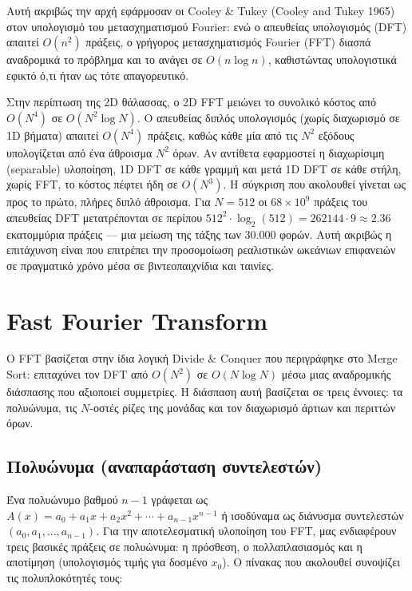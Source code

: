 Αυτή ακριβώς την αρχή εφάρμοσαν οι Cooley \& Tukey (Cooley and Tukey
1965) στον υπολογισμό του μετασχηματισμού Fourier: ενώ ο απευθείας
υπολογισμός (DFT) απαιτεί \(O(n^2)\) πράξεις, ο γρήγορος μετασχηματισμός
Fourier (FFT) διασπά αναδρομικά το πρόβλημα και το ανάγει σε
\(O(n \log n)\), καθιστώντας υπολογιστικά εφικτό ό,τι ήταν ως τότε
απαγορευτικό.

Στην περίπτωση της 2D θάλασσας, ο 2D FFT μειώνει το συνολικό κόστος από
\(O(N^4)\) σε \(O(N^2 \log N)\). Ο απευθείας διπλός υπολογισμός (χωρίς
διαχωρισμό σε 1D βήματα) απαιτεί \(O(N^4)\) πράξεις, καθώς κάθε μία από
τις \(N^2\) εξόδους υπολογίζεται από ένα άθροισμα \(N^2\) όρων. Αν
αντίθετα εφαρμοστεί η διαχωρίσιμη (separable) υλοποίηση, 1D DFT σε
κάθε γραμμή και μετά 1D DFT σε κάθε στήλη, χωρίς FFT, το κόστος
πέφτει ήδη σε \(O(N^3)\). Η σύγκριση που ακολουθεί γίνεται ως προς το πρώτο,
πλήρες διπλό άθροισμα. Για \(N=512\) οι
\(68 \times 10^9\) πράξεις του απευθείας DFT μετατρέπονται σε περίπου
\(512^2 \cdot \log_2(512) = 262144 \cdot 9 \approx 2.36\) εκατομμύρια
πράξεις --- μια μείωση της τάξης των 30.000 φορών. Αυτή ακριβώς η
επιτάχυνση είναι που επιτρέπει την προσομοίωση ρεαλιστικών ωκεάνιων
επιφανειών σε πραγματικό χρόνο μέσα σε βιντεοπαιχνίδια και ταινίες.

\section{Fast Fourier Transform}\label{fast-fourier-transform}

Ο FFT βασίζεται στην ίδια λογική Divide \& Conquer που περιγράφηκε στο
Merge Sort: επιταχύνει τον DFT από \(O(N^2)\) σε \(O(N \log N)\) μέσω
μιας αναδρομικής διάσπασης που αξιοποιεί συμμετρίες. Η διάσπαση αυτή
βασίζεται σε τρεις έννοιες: τα πολυώνυμα, τις \(N\)-οστές ρίζες της
μονάδας και τον διαχωρισμό άρτιων και περιττών όρων.

\subsection{Πολυώνυμα (αναπαράσταση
συντελεστών)}\label{ux3c0ux3bfux3bbux3c5ux3ceux3bdux3c5ux3bcux3b1-ux3b1ux3bdux3b1ux3c0ux3b1ux3c1ux3acux3c3ux3c4ux3b1ux3c3ux3b7-ux3c3ux3c5ux3bdux3c4ux3b5ux3bbux3b5ux3c3ux3c4ux3ceux3bd}

Ένα πολυώνυμο βαθμού \(n-1\) γράφεται ως
\(A(x) = a_0 + a_1 x + a_2 x^2 + \cdots + a_{n-1} x^{n-1}\) ή ισοδύναμα
ως διάνυσμα συντελεστών \((a_0, a_1, \ldots, a_{n-1})\). Για την
αποτελεσματική υλοποίηση του FFT, μας ενδιαφέρουν τρεις βασικές πράξεις
σε πολυώνυμα: η πρόσθεση, ο πολλαπλασιασμός και η αποτίμηση (υπολογισμός
τιμής για δοσμένο \(x_0\)). Ο πίνακας που ακολουθεί συνοψίζει τις
πολυπλοκότητές τους:

